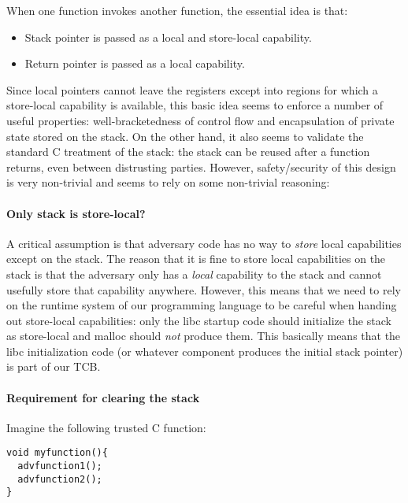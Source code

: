 \documentclass[a4paper]{article}
\begin{document}
When one function invokes another function, the essential idea is that:
\begin{itemize}
\item Stack pointer is passed as a local and store-local capability.
\item Return pointer is passed as a local capability.
\end{itemize}

Since local pointers cannot leave the registers except into regions for which a
store-local capability is available, this basic idea seems to enforce a number
of useful properties: well-bracketedness of control flow and encapsulation of
private state stored on the stack. On the other hand, it also seems to validate
the standard C treatment of the stack: the stack can be reused after a function
returns, even between distrusting parties. However, safety/security of this
design is very non-trivial and seems to rely on some non-trivial reasoning:

\paragraph{Only stack is store-local?}
A critical assumption is that adversary code has no way to \emph{store} local
capabilities except on the stack. The reason that it is fine to store local
capabilities on the stack is that the adversary only has a \emph{local}
capability to the stack and cannot usefully store that capability anywhere.
However, this means that we need to rely on the runtime system of our
programming language to be careful when handing out store-local capabilities:
only the libc startup code should initialize the stack as store-local and malloc
should \emph{not} produce them. This basically means that the libc
initialization code (or whatever component produces the initial stack pointer)
is part of our TCB.

\paragraph{Requirement for clearing the stack}
Imagine the following trusted C function:

\begin{verbatim}
void myfunction(){
  advfunction1();
  advfunction2();
}
\end{verbatim}
\end{document}
